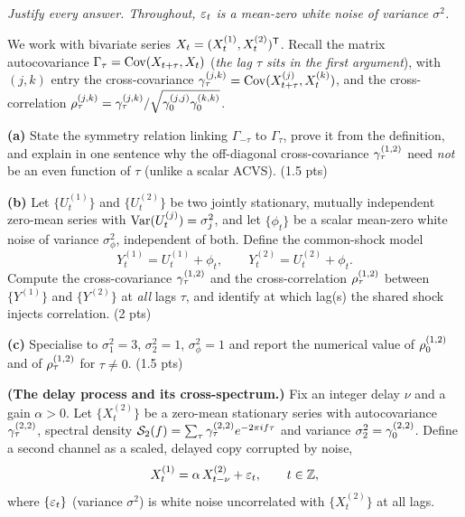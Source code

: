 \documentclass[11pt]{article}
\begin{document}
\pointstable
\begin{center}\itshape Justify every answer. Throughout, $\varepsilon_t$ is a mean-zero white noise of variance $\sigma^2$.\end{center}

We work with bivariate series $X_t=(X_t^{(1)},X_t^{(2)})^{\mathsf{T}}$. Recall the matrix
autocovariance $\Gamma_\tau=\operatorname{Cov}(X_{t+\tau},X_t)$ (\emph{the lag $\tau$ sits in
the first argument}), with $(j,k)$ entry the cross-covariance
$\gamma_\tau^{(j,k)}=\operatorname{Cov}(X_{t+\tau}^{(j)},X_t^{(k)})$, and the
cross-correlation $\rho_\tau^{(j,k)}=\gamma_\tau^{(j,k)}/\sqrt{\gamma_0^{(j,j)}\gamma_0^{(k,k)}}$.

\textbf{(a)} State the symmetry relation linking $\Gamma_{-\tau}$ to $\Gamma_\tau$, prove it from the definition, and explain in one sentence why the off-diagonal cross-covariance $\gamma_\tau^{(1,2)}$ need \emph{not} be an even function of $\tau$ (unlike a scalar ACVS). \hfill(1.5 pts)

\textbf{(b)} Let $\{U_t^{(1)}\}$ and $\{U_t^{(2)}\}$ be two jointly stationary, mutually independent zero-mean series with $\operatorname{Var}(U_t^{(j)})=\sigma_j^2$, and let $\{\phi_t\}$ be a scalar mean-zero white noise of variance $\sigma_\phi^2$, independent of both. Define the common-shock model
\[
Y_t^{(1)}=U_t^{(1)}+\phi_t,\qquad Y_t^{(2)}=U_t^{(2)}+\phi_t .
\]
Compute the cross-covariance $\gamma_\tau^{(1,2)}$ and the cross-correlation $\rho_\tau^{(1,2)}$ between $\{Y^{(1)}\}$ and $\{Y^{(2)}\}$ at \emph{all} lags $\tau$, and identify at which lag(s) the shared shock injects correlation. \hfill(2 pts)

\textbf{(c)} Specialise to $\sigma_1^2=3$, $\sigma_2^2=1$, $\sigma_\phi^2=1$ and report the numerical value of $\rho_0^{(1,2)}$ and of $\rho_\tau^{(1,2)}$ for $\tau\neq0$. \hfill(1.5 pts)
\answerpage

\textbf{(The delay process and its cross-spectrum.)} Fix an integer delay $\nu$ and a gain $\alpha>0$. Let $\{X_t^{(2)}\}$ be a zero-mean stationary series with autocovariance $\gamma_\tau^{(2,2)}$, spectral density $\mathcal{S}_2(f)=\sum_\tau\gamma_\tau^{(2,2)}e^{-2\pi if\tau}$ and variance $\sigma_2^2=\gamma_0^{(2,2)}$. Define a second channel as a scaled, delayed copy corrupted by noise,
\[
X_t^{(1)}=\alpha\,X_{t-\nu}^{(2)}+\varepsilon_t ,\qquad t\in\mathbb{Z},
\]
where $\{\varepsilon_t\}$ (variance $\sigma^2$) is white noise uncorrelated with $\{X_t^{(2)}\}$ at all lags.
\end{document}
